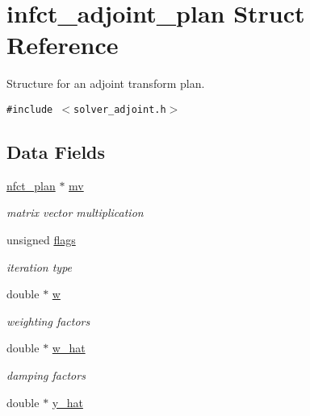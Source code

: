 \hypertarget{structinfct__adjoint__plan}{
\section{infct\_\-adjoint\_\-plan Struct Reference}
\label{structinfct__adjoint__plan}
}
Structure for an adjoint transform plan.  


{\tt \#include $<$solver\_\-adjoint.h$>$}

\subsection*{Data Fields}
\begin{CompactItemize}
\item 
\hypertarget{structinfct__adjoint__plan_o0}{
\hyperlink{structnfct__plan}{nfct\_\-plan} $\ast$ \hyperlink{structinfct__adjoint__plan_o0}{mv}}
\label{structinfct__adjoint__plan_o0}

\begin{CompactList}\small\item\em matrix vector multiplication \item\end{CompactList}\item 
\hypertarget{structinfct__adjoint__plan_o1}{
unsigned \hyperlink{structinfct__adjoint__plan_o1}{flags}}
\label{structinfct__adjoint__plan_o1}

\begin{CompactList}\small\item\em iteration type \item\end{CompactList}\item 
\hypertarget{structinfct__adjoint__plan_o2}{
double $\ast$ \hyperlink{structinfct__adjoint__plan_o2}{w}}
\label{structinfct__adjoint__plan_o2}

\begin{CompactList}\small\item\em weighting factors \item\end{CompactList}\item 
\hypertarget{structinfct__adjoint__plan_o3}{
double $\ast$ \hyperlink{structinfct__adjoint__plan_o3}{w\_\-hat}}
\label{structinfct__adjoint__plan_o3}

\begin{CompactList}\small\item\em damping factors \item\end{CompactList}\item 
\hypertarget{structinfct__adjoint__plan_o4}{
double $\ast$ \hyperlink{structinfct__adjoint__plan_o4}{y\_\-hat}}
\label{structinfct__adjoint__plan_o4}


\end{CompactItemize}
